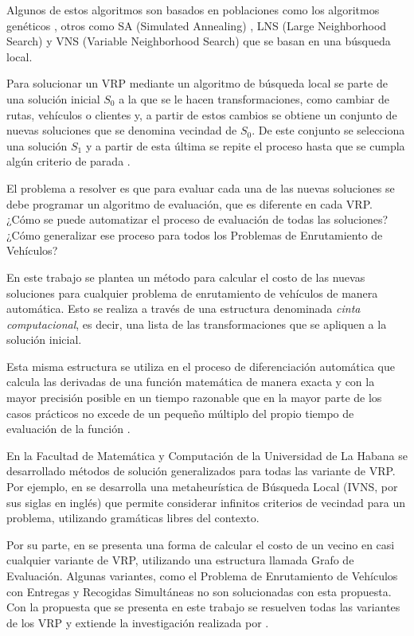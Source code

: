 Algunos de estos algoritmos son basados en poblaciones como los algoritmos genéticos \cite{Mester}, otros como SA (Simulated Annealing) \cite{Liu}, LNS (Large Neighborhood Search) \cite{Ropke} y VNS (Variable Neighborhood Search) \cite{Camila} que se basan en una búsqueda local.

Para solucionar un VRP mediante un algoritmo de búsqueda local se parte de una solución inicial $S_{0}$ a la que se le hacen transformaciones, como cambiar de rutas, vehículos o clientes y, a partir de estos cambios se obtiene un conjunto de nuevas soluciones que se denomina vecindad de $S_{0}$. De este conjunto se selecciona una solución $S_{1}$ y a partir de esta última se repite el proceso hasta que se cumpla algún criterio de parada \cite{JJ}. 

El problema a resolver es que para evaluar cada una de las nuevas soluciones se debe programar un algoritmo de evaluación, que es diferente en cada VRP. ¿Cómo se puede automatizar el proceso de evaluación de todas las soluciones? ¿Cómo generalizar ese proceso para todos los Problemas de Enrutamiento de Vehículos?

En este trabajo se plantea un método para calcular el costo de las nuevas soluciones para cualquier problema de enrutamiento de vehículos de manera automática. Esto se realiza a través de una estructura denominada \textit{cinta computacional}, es decir, una lista de las transformaciones que se apliquen a la solución inicial.

Esta misma estructura se utiliza en el proceso de diferenciación automática que calcula las derivadas de una función matemática de manera exacta y con la mayor precisión posible en un tiempo razonable que en la mayor parte de los casos prácticos no excede de un pequeño múltiplo del propio tiempo de evaluación de la función \cite{Manuel,Griewank}.

En la Facultad de Matemática y Computación de la Universidad de La Habana se desarrollado métodos de solución generalizados para todas las variante de VRP. Por ejemplo, en \cite{Camila} se desarrolla una metaheurística de Búsqueda Local (IVNS, por sus siglas en inglés) que permite considerar infinitos criterios de vecindad para un problema, utilizando gramáticas libres del contexto. 

Por su parte, en \cite{JJ} se presenta una forma de calcular el costo de un vecino en casi cualquier variante de VRP, utilizando una estructura llamada Grafo de Evaluación. Algunas variantes, como el Problema de Enrutamiento de Vehículos con Entregas y Recogidas Simultáneas no son solucionadas con esta propuesta. Con la propuesta que se presenta en este trabajo se resuelven todas las variantes de los VRP y extiende la investigación realizada por \cite{JJ}. 

